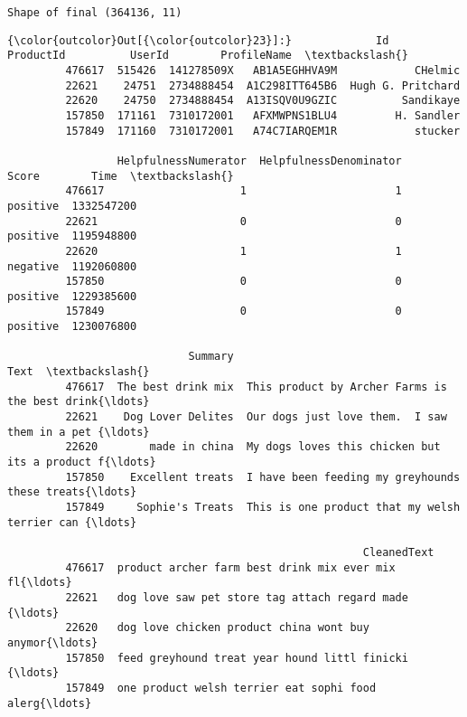 \documentclass[11pt]{article}
\begin{document}
    \begin{Verbatim}[commandchars=\\\{\}]
Shape of final (364136, 11)

    \end{Verbatim}

\begin{Verbatim}[commandchars=\\\{\}]
{\color{outcolor}Out[{\color{outcolor}23}]:}             Id   ProductId          UserId        ProfileName  \textbackslash{}
         476617  515426  141278509X   AB1A5EGHHVA9M            CHelmic   
         22621    24751  2734888454  A1C298ITT645B6  Hugh G. Pritchard   
         22620    24750  2734888454  A13ISQV0U9GZIC          Sandikaye   
         157850  171161  7310172001   AFXMWPNS1BLU4         H. Sandler   
         157849  171160  7310172001   A74C7IARQEM1R            stucker   
         
                 HelpfulnessNumerator  HelpfulnessDenominator     Score        Time  \textbackslash{}
         476617                     1                       1  positive  1332547200   
         22621                      0                       0  positive  1195948800   
         22620                      1                       1  negative  1192060800   
         157850                     0                       0  positive  1229385600   
         157849                     0                       0  positive  1230076800   
         
                            Summary                                               Text  \textbackslash{}
         476617  The best drink mix  This product by Archer Farms is the best drink{\ldots}   
         22621    Dog Lover Delites  Our dogs just love them.  I saw them in a pet {\ldots}   
         22620        made in china  My dogs loves this chicken but its a product f{\ldots}   
         157850    Excellent treats  I have been feeding my greyhounds these treats{\ldots}   
         157849     Sophie's Treats  This is one product that my welsh terrier can {\ldots}   
         
                                                       CleanedText  
         476617  product archer farm best drink mix ever mix fl{\ldots}  
         22621   dog love saw pet store tag attach regard made {\ldots}  
         22620   dog love chicken product china wont buy anymor{\ldots}  
         157850  feed greyhound treat year hound littl finicki {\ldots}  
         157849  one product welsh terrier eat sophi food alerg{\ldots}  
\end{Verbatim}
            
\end{document}
